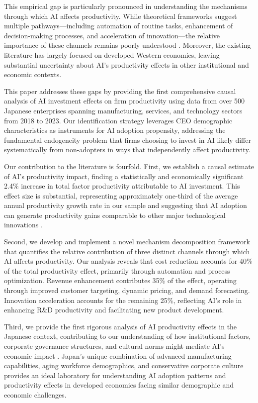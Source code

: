 \documentclass[12pt, a4paper]{article}
\begin{document}
This empirical gap is particularly pronounced in understanding the mechanisms through which AI affects productivity. While theoretical frameworks suggest multiple pathways—including automation of routine tasks, enhancement of decision-making processes, and acceleration of innovation—the relative importance of these channels remains poorly understood \citep{brynjolfsson2019artificial, agrawal2018prediction}. Moreover, the existing literature has largely focused on developed Western economies, leaving substantial uncertainty about AI's productivity effects in other institutional and economic contexts.

This paper addresses these gaps by providing the first comprehensive causal analysis of AI investment effects on firm productivity using data from over 500 Japanese enterprises spanning manufacturing, services, and technology sectors from 2018 to 2023. Our identification strategy leverages CEO demographic characteristics as instruments for AI adoption propensity, addressing the fundamental endogeneity problem that firms choosing to invest in AI likely differ systematically from non-adopters in ways that independently affect productivity.

Our contribution to the literature is fourfold. First, we establish a causal estimate of AI's productivity impact, finding a statistically and economically significant 2.4\% increase in total factor productivity attributable to AI investment. This effect size is substantial, representing approximately one-third of the average annual productivity growth rate in our sample and suggesting that AI adoption can generate productivity gains comparable to other major technological innovations \citep{bresnahan1995general}.

Second, we develop and implement a novel mechanism decomposition framework that quantifies the relative contribution of three distinct channels through which AI affects productivity. Our analysis reveals that cost reduction accounts for 40\% of the total productivity effect, primarily through automation and process optimization. Revenue enhancement contributes 35\% of the effect, operating through improved customer targeting, dynamic pricing, and demand forecasting. Innovation acceleration accounts for the remaining 25\%, reflecting AI's role in enhancing R\&D productivity and facilitating new product development.

Third, we provide the first rigorous analysis of AI productivity effects in the Japanese context, contributing to our understanding of how institutional factors, corporate governance structures, and cultural norms might mediate AI's economic impact \citep{aoki2019japanese}. Japan's unique combination of advanced manufacturing capabilities, aging workforce demographics, and conservative corporate culture provides an ideal laboratory for understanding AI adoption patterns and productivity effects in developed economies facing similar demographic and economic challenges.
\end{document}
